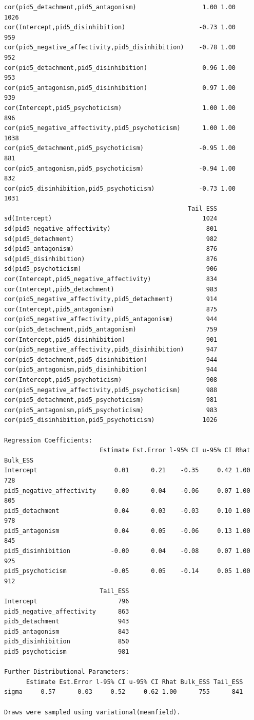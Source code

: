 \documentclass[
  11pt,
  a4paper,
  onecolumn]{article}
\begin{document}
\begin{verbatim}
cor(pid5_detachment,pid5_antagonism)                  1.00 1.00     1026
cor(Intercept,pid5_disinhibition)                    -0.73 1.00      959
cor(pid5_negative_affectivity,pid5_disinhibition)    -0.78 1.00      952
cor(pid5_detachment,pid5_disinhibition)               0.96 1.00      953
cor(pid5_antagonism,pid5_disinhibition)               0.97 1.00      939
cor(Intercept,pid5_psychoticism)                      1.00 1.00      896
cor(pid5_negative_affectivity,pid5_psychoticism)      1.00 1.00     1038
cor(pid5_detachment,pid5_psychoticism)               -0.95 1.00      881
cor(pid5_antagonism,pid5_psychoticism)               -0.94 1.00      832
cor(pid5_disinhibition,pid5_psychoticism)            -0.73 1.00     1031
                                                  Tail_ESS
sd(Intercept)                                         1024
sd(pid5_negative_affectivity)                          801
sd(pid5_detachment)                                    982
sd(pid5_antagonism)                                    876
sd(pid5_disinhibition)                                 876
sd(pid5_psychoticism)                                  906
cor(Intercept,pid5_negative_affectivity)               834
cor(Intercept,pid5_detachment)                         983
cor(pid5_negative_affectivity,pid5_detachment)         914
cor(Intercept,pid5_antagonism)                         875
cor(pid5_negative_affectivity,pid5_antagonism)         944
cor(pid5_detachment,pid5_antagonism)                   759
cor(Intercept,pid5_disinhibition)                      901
cor(pid5_negative_affectivity,pid5_disinhibition)      947
cor(pid5_detachment,pid5_disinhibition)                944
cor(pid5_antagonism,pid5_disinhibition)                944
cor(Intercept,pid5_psychoticism)                       908
cor(pid5_negative_affectivity,pid5_psychoticism)       988
cor(pid5_detachment,pid5_psychoticism)                 981
cor(pid5_antagonism,pid5_psychoticism)                 983
cor(pid5_disinhibition,pid5_psychoticism)             1026

Regression Coefficients:
                          Estimate Est.Error l-95% CI u-95% CI Rhat Bulk_ESS
Intercept                     0.01      0.21    -0.35     0.42 1.00      728
pid5_negative_affectivity     0.00      0.04    -0.06     0.07 1.00      805
pid5_detachment               0.04      0.03    -0.03     0.10 1.00      978
pid5_antagonism               0.04      0.05    -0.06     0.13 1.00      845
pid5_disinhibition           -0.00      0.04    -0.08     0.07 1.00      925
pid5_psychoticism            -0.05      0.05    -0.14     0.05 1.00      912
                          Tail_ESS
Intercept                      796
pid5_negative_affectivity      863
pid5_detachment                943
pid5_antagonism                843
pid5_disinhibition             850
pid5_psychoticism              981

Further Distributional Parameters:
      Estimate Est.Error l-95% CI u-95% CI Rhat Bulk_ESS Tail_ESS
sigma     0.57      0.03     0.52     0.62 1.00      755      841

Draws were sampled using variational(meanfield). 
\end{verbatim}
\end{document}

